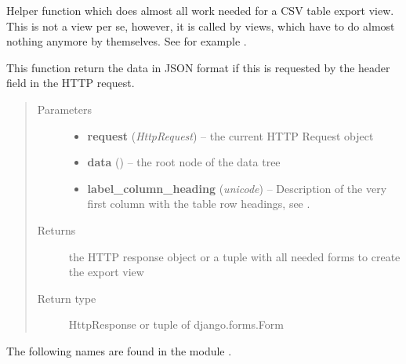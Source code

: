 \documentclass[a4paper,11pt,english]{sphinxmanual}
\begin{document}
\begin{fulllineitems}
\label{programming/utilities:samples.utils.views.table_export}
Helper function which does almost all work needed for a CSV table
export view.  This is not a view per se, however, it is called by views,
which have to do almost nothing anymore by themselves.  See for example
.

This function return the data in JSON format if this is requested by the
 header field in the HTTP request.
\begin{quote}\begin{description}
\item[{Parameters}] \leavevmode\begin{itemize}
\item {} 
\textbf{request} (\emph{HttpRequest}) -- the current HTTP Request object

\item {} 
\textbf{data} () -- the root node of the data tree

\item {} 
\textbf{label\_column\_heading} (\emph{unicode}) -- Description of the very first column with the
table row headings, see .

\end{itemize}

\item[{Returns}] \leavevmode
the HTTP response object or a tuple with all needed forms to create the export view

\item[{Return type}] \leavevmode
HttpResponse or tuple of django.forms.Form

\end{description}\end{quote}

\end{fulllineitems}


The following names are found in the module .
\end{document}
